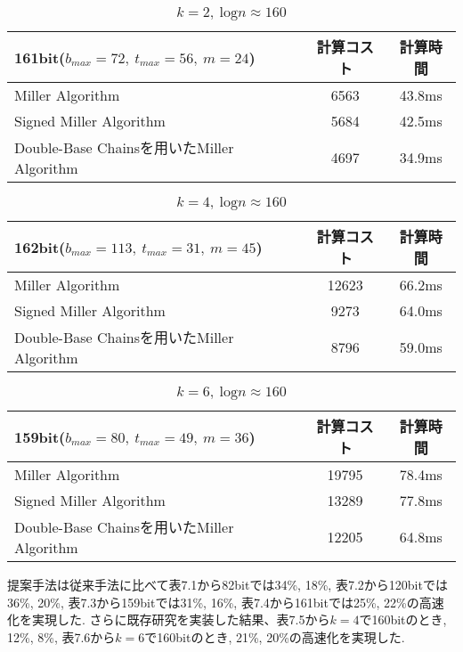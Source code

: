 \begin{table}[htb]
 \begin{center}
  \begin{tabular}{|l|c|c|}
  \hline
  161bit($b_{max} = 72,\ t_{max} = 56,\ m = 24$) & 計算コスト& 計算時間\\
  \hline
  Miller Algorithm & 6563 & 43.8ms \\
  \hline
  Signed Miller Algorithm & 5684 & 42.5ms \\
  \hline
  Double-Base Chainsを用いたMiller Algorithm & 4697 & 34.9ms \\
  \hline
  \end{tabular}
 \end{center}
 \caption{$k=2,\ \mbox{log}n \approx 160$}
\end{table}
\begin{table}[htb]
 \begin{center}
  \begin{tabular}{|l|c|c|}
  \hline
  162bit($b_{max} = 113,\ t_{max} = 31,\ m = 45$) & 計算コスト& 計算時間\\
  \hline
  Miller Algorithm & 12623 & 66.2ms \\
  \hline
  Signed Miller Algorithm & 9273 & 64.0ms \\
  \hline
  Double-Base Chainsを用いたMiller Algorithm & 8796 & 59.0ms \\
  \hline
  \end{tabular}
 \end{center}
 \caption{$k=4,\ \mbox{log}n \approx 160$}
\end{table}
\begin{table}[htbp]
 \begin{center}
  \begin{tabular}{|l|c|c|}
  \hline
  159bit($b_{max} = 80,\ t_{max} = 49,\ m = 36$) & 計算コスト& 計算時間\\
  \hline
  Miller Algorithm & 19795 & 78.4ms \\
  \hline
  Signed Miller Algorithm & 13289 & 77.8ms \\
  \hline
  Double-Base Chainsを用いたMiller Algorithm & 12205 & 64.8ms \\
  \hline
  \end{tabular}
 \end{center}
 \caption{$k=6,\ \mbox{log}n \approx 160$}
\end{table}
\vspace{2cm}
\par
提案手法は従来手法に比べて表7.1から82bitでは34\%, 18\%, 表7.2から120bitでは36\%, 20\%, 表7.3から159bitでは31\%, 16\%, 表7.4から161bitでは25\%, 22\%の高速化を実現した. 
さらに既存研究を実装した結果、表7.5から$k=4$で160bitのとき,  12\%, 8\%, 表7.6から$k=6$で160bitのとき, 21\%, 20\%の高速化を実現した. 
\clearpage
